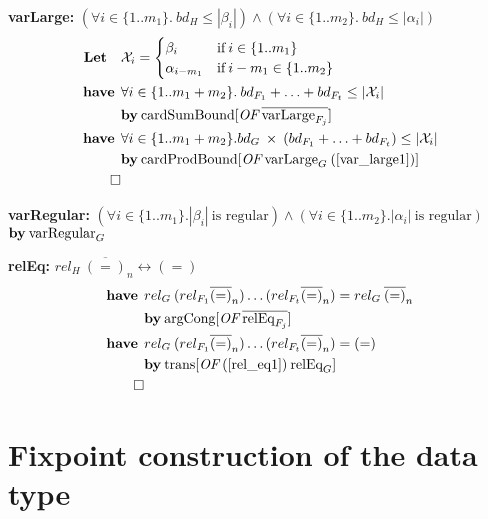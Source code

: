 \textbf{varLarge:} $(\forall i \in \{1..m_1\}. \: bd_H \le |\beta_i|) \wedge (\forall i \in \{1..m_2\}. \: bd_H \le |\alpha_i|)$
\begin{align}
\textbf{Let} \quad & \mathcal{X}_i = \begin{cases}
\beta_i & \text{if} \: i \in \{1..m_1\} \\
\alpha_{i-m_1} & \text{if} \: i - m_1 \in \{1..m_2\}
\end{cases} \nonumber \\
%
\have & \forall i \in \{1..m_1+m_2\}. \: bd_{F_1} + \dots + bd_{F_t} \le |\mathcal{X}_i| \label{var_large1} \\*
& \by \OF{\text{cardSumBound}}{\overline{\text{varLarge}_{F_j}}} \nonumber \\
%
\have & \forall i \in \{1..m_1+m_2\}. bd_G \: \times \: (bd_{F_1} + \dots + bd_{F_t}) \le |\mathcal{X}_i| \\*
& \by \OF{\text{cardProdBound}}{\text{varLarge}_G \: (\ref{var_large1})} \nonumber \\*
\qed \nonumber
\end{align}

\textbf{varRegular:} $(\forall i \in \{1..m_1\}. |\beta_i| \: \text{is regular}) \wedge (\forall i \in \{1..m_2\}. |\alpha_i| \: \text{is regular})$ \\
\hspace*{1.7em} $\textbf{by}\: \text{varRegular}_G$

\vspace*{1.5em}

\textbf{relEq:} $rel_H \: \overline{(=)}_n \longleftrightarrow (=)$
\begin{align}
\have & rel_G \: (rel_{F_1} \overline{(=)}_n)\dots(rel_{F_t} \overline{(=)}_n) = rel_G \: \overline{(=)}_n \label{rel_eq1} \\*
& \by \OF{\text{argCong}}{\overline{\text{relEq}_{F_j}}} \nonumber \\
%
\have & rel_G \: (rel_{F_1} \overline{(=)}_n)\dots(rel_{F_t} \overline{(=)}_n) = (=) \\*
& \by \OF{\text{trans}}{(\ref{rel_eq1}) \: \text{relEq}_G} \nonumber \\*
\qed \nonumber
\end{align}

\section{Fixpoint construction of the data type}\label{sec:fixpoint}

